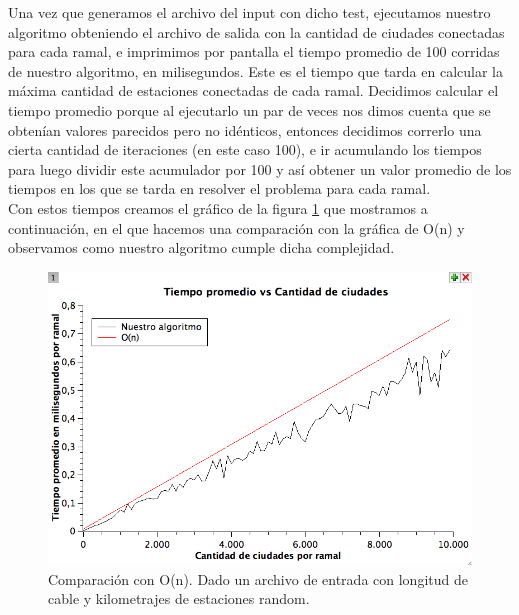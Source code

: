 Una vez que generamos el archivo del input con dicho test, ejecutamos nuestro algoritmo obteniendo el archivo de salida con la cantidad de ciudades conectadas para cada ramal, e imprimimos por pantalla el tiempo promedio de 100 corridas de nuestro algoritmo, en milisegundos. Este es el tiempo que tarda en calcular la máxima cantidad de estaciones conectadas de cada ramal. Decidimos calcular el tiempo promedio porque al ejecutarlo un par de veces nos dimos cuenta que se obtenían valores parecidos pero no idénticos, entonces decidimos correrlo una cierta cantidad de iteraciones (en este caso 100), e ir acumulando los tiempos para luego dividir este acumulador por 100 y así obtener un valor promedio de los tiempos en los que se tarda en resolver el problema para cada ramal. \\

Con estos tiempos creamos el gráfico de la figura \ref{ej1-tiempo-vs-cant-ciudades-random} que mostramos a continuación, en el que hacemos una comparación con la gráfica de O(n) y observamos como nuestro algoritmo cumple dicha complejidad.

\begin{figure}[H]
\begin{center}

  \includegraphics[width=\linewidth]{../graficos/ej1/TIempoPromedioVsCantidadCIudades.png}
  \caption{{\small Comparación con O(n). Dado un archivo de entrada con longitud de cable y kilometrajes de estaciones random.}} \label{ej1-tiempo-vs-cant-ciudades-random}
\endminipage

\end{center}
\end{figure}

